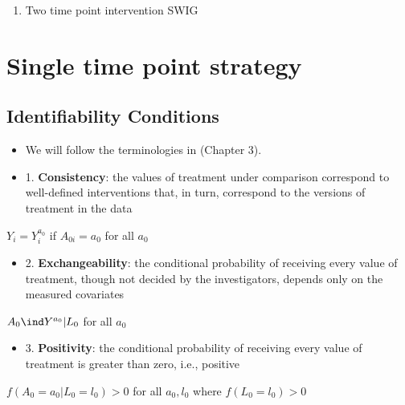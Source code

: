 \documentclass[dvipdfmx,10pt]{article}
\begin{document}
\begin{enumerate}
\item Two time point intervention SWIG
\label{sec:org60f07b7}
\begin{center}
\end{center}
\end{enumerate}


\section{Single time point strategy}
\label{sec:org75a5ac0}
\subsection{Identifiability Conditions}
\label{sec:org6698a64}
\begin{itemize}
\item We will follow the terminologies in \cite{hernanCausalInference2019} (Chapter 3).
\item 1. \textbf{Consistency}: the values of treatment under comparison correspond to well-defined interventions that, in turn, correspond to the versions of treatment in the data
\end{itemize}
\begin{center}
\(Y_{i} = Y_{i}^{a_{0}}\) if \(A_{0i} = a_{0}\) for all \(a_{0}\)
\end{center}
\begin{itemize}
\item 2. \textbf{Exchangeability}: the conditional probability of receiving every value of treatment, though not decided by the investigators, depends only on the measured covariates
\end{itemize}
\begin{center}
\(A_{0} \ind Y^{a_{0}} | L_{0}\) for all \(a_{0}\)
\end{center}
\begin{itemize}
\item 3. \textbf{Positivity}: the conditional probability of receiving every value of treatment is greater than zero, i.e., positive
\end{itemize}
\begin{center}
\(f(A_{0} = a_{0} | L_{0} = l_{0}) > 0\) for all \(a_{0},l_{0}\) where \(f(L_{0} = l_{0}) > 0\)
\end{center}
\end{document}
